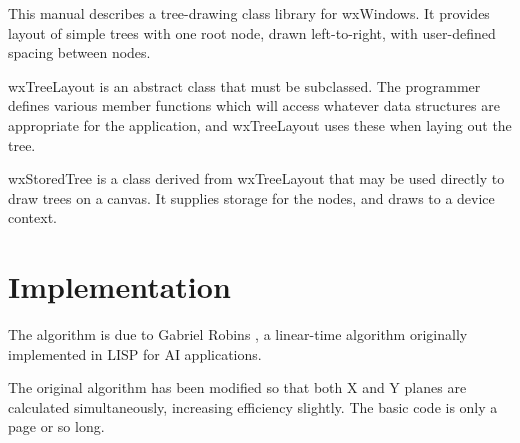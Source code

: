 This manual describes a tree-drawing class library for wxWindows. It
provides layout of simple trees with one root node, drawn left-to-right,
with user-defined spacing between nodes.

wxTreeLayout is an abstract class that must be subclassed. The programmer
defines various member functions which will access whatever data structures
are appropriate for the application, and wxTreeLayout uses these when laying
out the tree.

wxStoredTree is a class derived from wxTreeLayout that may be used directly to
draw trees on a canvas. It supplies storage for the nodes, and draws
to a device context.


\chapter{Implementation}
%
\setfooter{\thepage}{}{}{}{}{\thepage}

The algorithm is due to Gabriel Robins \cite{robins87}, a linear-time
algorithm originally implemented in LISP for AI applications.

The original algorithm has been modified so that both X and Y planes
are calculated simultaneously, increasing efficiency slightly. The basic
code is only a page or so long.


%


%
\setfooter{\thepage}{}{}{}{}{\thepage}
\printindex

